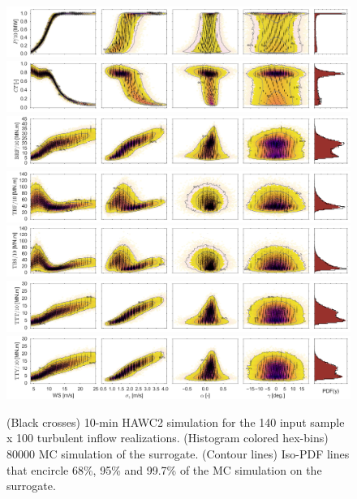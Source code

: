 \documentclass[preprint,12pt]{elsarticle}
\begin{document}
\begin{figure}[p]
\begin{centering}
\includegraphics[width=\linewidth]{Figures/Full_surrogate_red_file/P_PCE_MC_surrogate_last_row.jpg} \\
\includegraphics[width=\linewidth]{Figures/Full_surrogate_red_file/CT_PCE_MC_surrogate_last_row.jpg} \\
\includegraphics[width=\linewidth]{Figures/Full_surrogate_red_file/BRFBM_EFL_M12_PCE_MC_surrogate_last_row.jpg} \\
\includegraphics[width=\linewidth]{Figures/Full_surrogate_red_file/TBFBM_EFL_M4_PCE_MC_surrogate_last_row.jpg} \\
\includegraphics[width=\linewidth]{Figures/Full_surrogate_red_file/TBSBM_EFL_M4_PCE_MC_surrogate_last_row.jpg} \\
\includegraphics[width=\linewidth]{Figures/Full_surrogate_red_file/TTTBM_EFL_M4_PCE_MC_surrogate_last_row.jpg} \\
\includegraphics[width=\linewidth]{Figures/Full_surrogate_red_file/TTYBM_EFL_M4_PCE_MC_surrogate_last_row.jpg}
\caption{(Black crosses) 10-min HAWC2 simulation for the 140 input sample x 100 turbulent inflow realizations. (Histogram colored hex-bins) 80000 MC simulation of the surrogate. (Contour lines) Iso-PDF lines that encircle 68\%, 95\% and 99.7\% of the MC simulation on the surrogate.}
\label{fig_final_surrogates}
\end{centering}
\end{figure}
\end{document}
